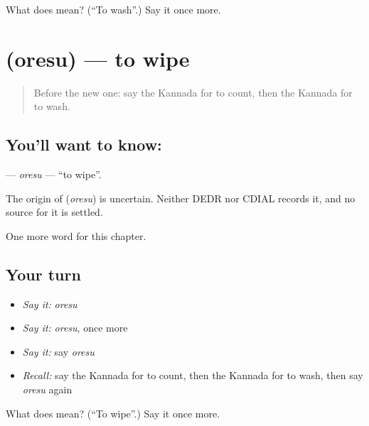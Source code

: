 \begin{tcolorbox}[breakable,colback=teal!4,colframe=teal!35!black,title={Before you move on}]
What does  mean? (\textquotedblleft{}To wash\textquotedblright{}.) Say it once more.
\end{tcolorbox}
\section[\texorpdfstring{\kn{ಒರೆಸು} (oresu)}{ಒರೆಸು (oresu)}]{ (oresu) — to wipe}

\label{lesson:KA-C150-oresu}



\begin{quote}
Before the new one: say the Kannada for to count, then the Kannada for to wash.
\end{quote}

\subsection*{You'll want to know: }
\textbf{} — \emph{oresu} — \textquotedblleft{}to wipe\textquotedblright{}.

\begin{cousinweb}
The origin of \textbf{} (\emph{oresu}) is uncertain. Neither DEDR nor CDIAL records it, and no source for it is settled.
\end{cousinweb}

\begin{grammarlens}[title={What you've built}]
One more word for this chapter.
\end{grammarlens}

\subsection*{Your turn}
\begin{itemize}
\raggedright
  \item \emph{Say it:} \emph{oresu}
  \item \emph{Say it:} \emph{oresu}, once more
  \item \emph{Say it:} say \emph{oresu}
  \item \emph{Recall:} say the Kannada for to count, then the Kannada for to wash, then say \emph{oresu} again
\end{itemize}

\begin{tcolorbox}[breakable,colback=teal!4,colframe=teal!35!black,title={Before you move on}]
What does  mean? (\textquotedblleft{}To wipe\textquotedblright{}.) Say it once more.
\end{tcolorbox}
